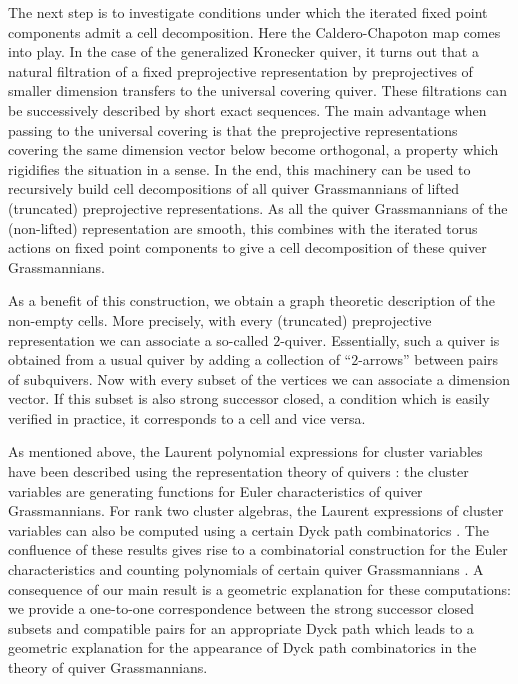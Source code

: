 \documentclass{amsart}
\numberwithin{equation}{section}
\begin{document}
The next step is to investigate conditions under which the iterated fixed point components admit a cell decomposition.
Here the Caldero-Chapoton map comes into play.
In the case of the generalized Kronecker quiver, it turns out that a natural filtration of a fixed preprojective representation by preprojectives of smaller dimension transfers to the universal covering quiver.
These filtrations can be successively described by short exact sequences.
The main advantage when passing to the universal covering is that the preprojective representations covering the same dimension vector below become orthogonal, a property which rigidifies the situation in a sense.
In the end, this machinery can be used to recursively build cell decompositions of all quiver Grassmannians of lifted (truncated) preprojective representations.
As all the quiver Grassmannians of the (non-lifted) representation are smooth, this combines with the iterated torus actions on fixed point components to give a cell decomposition of these quiver Grassmannians.

As a benefit of this construction, we obtain a graph theoretic description of the non-empty cells.
More precisely, with every (truncated) preprojective representation we can associate a so-called $2$-quiver.
Essentially, such a quiver is obtained from a usual quiver by adding a collection of ``$2$-arrows'' between pairs of subquivers.
Now with every subset of the vertices we can associate a dimension vector.
If this subset is also strong successor closed, a condition which is easily verified in practice, it corresponds to a cell and vice versa.

As mentioned above, the Laurent polynomial expressions for cluster variables have been described using the representation theory of quivers \cite{cc,ck}: the cluster variables are generating functions for Euler characteristics of quiver Grassmannians.
For rank two cluster algebras, the Laurent expressions of cluster variables can also be computed using a certain Dyck path combinatorics \cite{llz}.
The confluence of these results gives rise to a combinatorial construction for the Euler characteristics and counting polynomials of certain quiver Grassmannians \cite{rupel}.
A consequence of our main result is a geometric explanation for these computations: we provide a one-to-one correspondence between the strong successor closed subsets and compatible pairs for an appropriate Dyck path which leads to a geometric explanation for the appearance of Dyck path combinatorics in the theory of quiver Grassmannians. 
\end{document}
